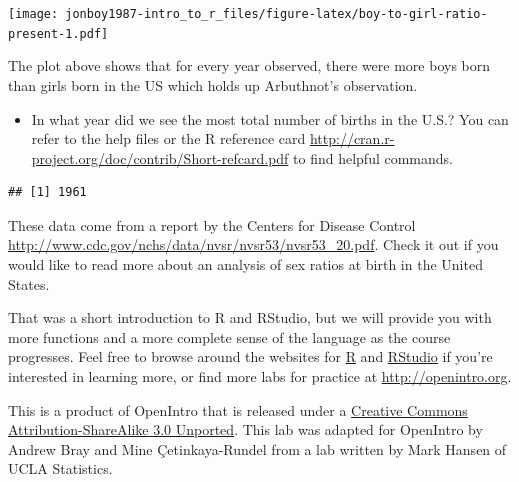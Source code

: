 \documentclass[]{article}
\newenvironment{Shaded}{\begin{snugshade}}{\end{snugshade}}
\newcommand{\KeywordTok}[1]{\textcolor[rgb]{0.13,0.29,0.53}{\textbf{#1}}}
\newcommand{\StringTok}[1]{\textcolor[rgb]{0.31,0.60,0.02}{#1}}
\newcommand{\CommentTok}[1]{\textcolor[rgb]{0.56,0.35,0.01}{\textit{#1}}}
\newcommand{\OperatorTok}[1]{\textcolor[rgb]{0.81,0.36,0.00}{\textbf{#1}}}
\newcommand{\NormalTok}[1]{#1}
\providecommand{\tightlist}{%
  \setlength{\itemsep}{0pt}\setlength{\parskip}{0pt}}
\begin{document}
\begin{Shaded}
\end{Shaded}

\texttt{[image: jonboy1987-intro\_to\_r\_files/figure-latex/boy-to-girl-ratio-present-1.pdf]}

The plot above shows that for every year observed, there were more boys
born than girls born in the US which holds up Arbuthnot's observation.

\begin{itemize}
\tightlist
\item
  In what year did we see the most total number of births in the U.S.?
  You can refer to the help files or the R reference card
  \url{http://cran.r-project.org/doc/contrib/Short-refcard.pdf} to find
  helpful commands.
\end{itemize}

\begin{Shaded}
\end{Shaded}

\begin{verbatim}
## [1] 1961
\end{verbatim}

These data come from a report by the Centers for Disease Control
\url{http://www.cdc.gov/nchs/data/nvsr/nvsr53/nvsr53_20.pdf}. Check it
out if you would like to read more about an analysis of sex ratios at
birth in the United States.

That was a short introduction to R and RStudio, but we will provide you
with more functions and a more complete sense of the language as the
course progresses. Feel free to browse around the websites for
\href{http://www.r-project.org}{R} and
\href{http://rstudio.org}{RStudio} if you're interested in learning
more, or find more labs for practice at \url{http://openintro.org}.

\hypertarget{license}{}
This is a product of OpenIntro that is released under a
\href{http://creativecommons.org/licenses/by-sa/3.0}{Creative Commons
Attribution-ShareAlike 3.0 Unported}. This lab was adapted for OpenIntro
by Andrew Bray and Mine Çetinkaya-Rundel from a lab written by Mark
Hansen of UCLA Statistics.
\end{document}
